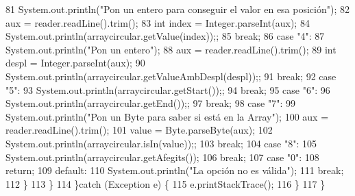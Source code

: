 \begin{DoxyCode}
81                     System.out.println(\textcolor{stringliteral}{"Pon un entero para conseguir el valor en esa posición"});
82                     aux = reader.readLine().trim();
83                     \textcolor{keywordtype}{int} index = Integer.parseInt(aux);
84                     System.out.println(arraycircular.getValue(index));;
85                 \textcolor{keywordflow}{break};
86                 \textcolor{keywordflow}{case} \textcolor{stringliteral}{"4"}:
87                     System.out.println(\textcolor{stringliteral}{"Pon un entero"});
88                     aux = reader.readLine().trim();
89                     \textcolor{keywordtype}{int} despl = Integer.parseInt(aux);
90                     System.out.println(arraycircular.getValueAmbDespl(despl));;
91                 \textcolor{keywordflow}{break};
92                 \textcolor{keywordflow}{case} \textcolor{stringliteral}{"5"}:
93                     System.out.println(arraycircular.getStart());;
94                 \textcolor{keywordflow}{break};
95                 \textcolor{keywordflow}{case} \textcolor{stringliteral}{"6"}:
96                     System.out.println(arraycircular.getEnd());;
97                 \textcolor{keywordflow}{break};
98                 \textcolor{keywordflow}{case} \textcolor{stringliteral}{"7"}:
99                     System.out.println(\textcolor{stringliteral}{"Pon un Byte para saber si está en la Array"});
100                     aux = reader.readLine().trim();
101                     value = Byte.parseByte(aux);
102                     System.out.println(arraycircular.isIn(value));;
103                 \textcolor{keywordflow}{break};
104                 \textcolor{keywordflow}{case} \textcolor{stringliteral}{"8"}:
105                     System.out.println(arraycircular.getAfegits());
106                 \textcolor{keywordflow}{break};
107                 \textcolor{keywordflow}{case} \textcolor{stringliteral}{"0"}:
108                     \textcolor{keywordflow}{return};
109                 \textcolor{keywordflow}{default}:
110                     System.out.println(\textcolor{stringliteral}{"La opción no es válida"});
111                 \textcolor{keywordflow}{break};
112             \}
113         \}
114     \}\textcolor{keywordflow}{catch} (Exception e) \{
115         e.printStackTrace();
116     \}
117     \}
\end{DoxyCode}
\mbox{\label{classdomini_1_1utils_1_1Driver____ArrayCircular_afac5a37f91b2914e692993e71c2d393c}} 
